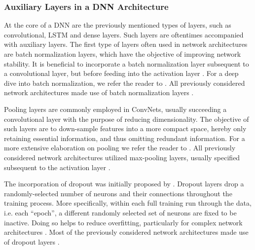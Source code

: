 \documentclass[fleqn,11pt]{paper}
\begin{document}
\subsubsection*{Auxiliary Layers in a DNN Architecture}
At the core of a DNN are the previously mentioned types of layers, such as convolutional, LSTM and dense layers. Such layers are oftentimes accompanied with auxiliary layers. The first type of layers often used in network architectures are batch normalization layers, which have the objective of improving network stability. It is beneficial to incorporate a batch normalization layer subsequent to a convolutional layer, but before feeding into the activation layer \cite{ioffe2015batch}.  For a deep dive into batch normalization, we refer the reader to . All previously considered network architectures made use of batch normalization layers \cite{biswas2019cornet, dolmans2020perceived, schirrmeister2017deep, sun2019hybrid, tabar2016novel}.

Pooling layers are commonly employed in ConvNets, usually succeeding a convolutional layer with the purpose of reducing dimensionality. The objective of such layers are to down-sample features into a more compact space, hereby only retaining essential information, and thus omitting redundant information. For a more extensive elaboration on pooling we refer the reader to . All previously considered network architectures utilized max-pooling layers, usually specified subsequent to the activation layer \cite{biswas2019cornet, dolmans2020perceived, schirrmeister2017deep, sun2019hybrid, tabar2016novel}.

The incorporation of dropout was initially proposed by . Dropout layers drop a randomly-selected number of neurons and their connections throughout the training process. More specifically, within each full training run through the data, i.e. each \enquote{epoch}, a different randomly selected set of neurons are fixed to be inactive. Doing so helps to reduce overfitting, particularly for complex network architectures \cite{srivastava2014dropout}.  Most of the previously considered network architectures made use of dropout layers \cite{biswas2019cornet, dolmans2020perceived, schirrmeister2017deep, sun2019hybrid}.
\end{document}
